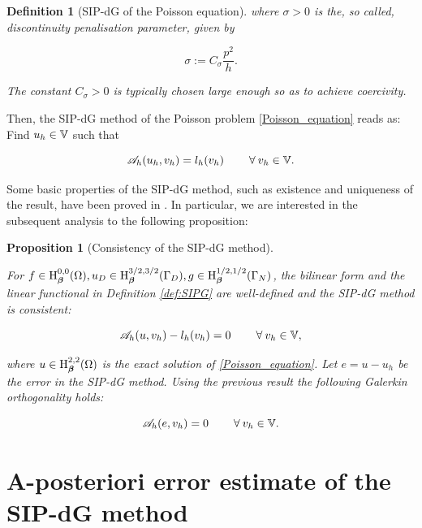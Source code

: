 \documentclass[a4paper,11pt]{article}
\newtheorem{definition}{Definition}[section]
\newtheorem{props}[theorem]{Proposition}
\begin{document}
{\begin{definition}[SIP-dG of the Poisson equation]
where $\sigma > 0$ is the, so called, \textit{discontinuity penalisation parameter}, given by

\begin{equation}
    \sigma := C_{\sigma} \frac{p^{2}}{h}.
\end{equation}

The constant $C_{\sigma} > 0$ is typically chosen large enough so as to achieve coercivity.

\end{definition}

Then, the SIP-dG method of the Poisson problem \eqref{Poisson_equation} reads as: Find $u_{h} \in \mathbb V$ such that

\begin{equation}
    \mathscr A_{h}(u_{h},v_{h}) = l_{h}(v_{h}) \quad \quad\:\forall\: v_{h} \in \mathbb V.
\label{eq:SIPDG_discrete}
\end{equation}

Some basic properties of the SIP-dG method, such as existence and uniqueness of the result, have been proved in \cite{Wihler:2003}. In particular, we are interested in the subsequent analysis to the following proposition: 

\begin{props}[Consistency of the SIP-dG method]\label{prop:consistency}

For $f \in \operatorname H^{0,0}_{\boldsymbol \beta}(\Omega), u_{D} \in \operatorname H^{3/2,3/2}_{\boldsymbol \beta}(\Gamma_{D}), g \in \operatorname H^{1/2,1/2}_{\boldsymbol \beta}(\Gamma_{N})$, the bilinear form and the linear functional in Definition \ref{def:SIPG} are well-defined and the SIP-dG method is consistent:

\begin{equation}
    \mathscr A_{h}(u,v_{h}) - l_{h}(v_{h}) = 0   \quad  \quad\:\forall\: v_{h} \in \mathbb V,
\label{eq:consistency}
\end{equation}

where $u \in \operatorname H^{2,2}_{\boldsymbol \beta}(\Omega)$ is the exact solution of \eqref{Poisson_equation}. Let $e = u - u_{h}$ be the error in the SIP-dG method. Using the previous result the following Galerkin orthogonality holds:

\begin{equation}
   \mathscr A_{h}(e,v_{h}) = 0 \quad \quad\:\forall\: v_{h} \in \mathbb V.
\label{Galerkin_orthogonality}
\end{equation}

\end{props}

\section{A-posteriori error estimate of the SIP-dG method}
\label{sec:a-posteriori}

}
\end{document}

